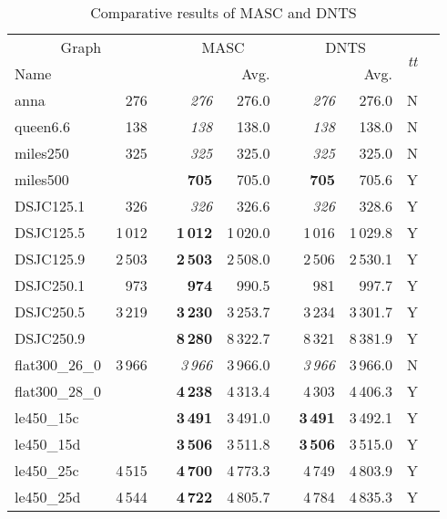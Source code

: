 \documentclass{elsart}
\begin{document}
\begin{table}\begin{scriptsize}
\caption{Comparative results of MASC and DNTS} \label{table_MASC_TS}
\begin{tabular}{lrcrrrrrcl}
\hline
\multicolumn{2}{c}{Graph} && \multicolumn{2}{c}{MASC} & &\multicolumn{2}{c}{DNTS} &\multirow{2}{*}{\emph{tt}}\\  
\cline{1-2}\cline{4-5} \cline{7-8} 
Name&&&  & Avg. & &  & Avg. \\
\hline
anna              & 276 && \emph{276} & 276.0 & &\emph{276}   & 276.0 & N\\
queen6.6          & 138 && \textit{138} & 138.0 && \emph{138}  & 138.0 &N\\
miles250          & 325    && \textit{325} & 325.0 & &\emph{325} & 325.0 &N \\
miles500          &    && \textbf{705} & 705.0 & & \textbf{705} & 705.6 &Y\\
DSJC125.1         & 326  && \textit{326}  & 326.6 & & \emph{326}  & 328.6 &Y\\
DSJC125.5         & 1\,012   && \textbf{1\,012}  & 1\,020.0  & & 1\,016  & 1\,029.8  &Y\\
DSJC125.9         & 2\,503 && \textbf{2\,503}  & 2\,508.0   & & 2\,506  & 2\,530.1  &Y \\
DSJC250.1         & 973  && \textbf{974}  & 990.5    &  & 981  & 997.7   &Y \\
DSJC250.5          &3\,219  &&\textbf{3\,230}  & 3\,253.7  & &3\,234  & 3\,301.7  &Y\\
DSJC250.9         &   && \textbf{8\,280}  & 8\,322.7   && 8\,321  & 8\,381.9   &Y\\
flat300\_26\_0    & 3\,966 && \textit{3\,966} & 3\,966.0  & & \emph{3\,966} & 3\,966.0  &N\\
flat300\_28\_0    &   &&  \textbf{4\,238} & 4\,313.4 & &  4\,303 & 4\,406.3 &Y\\
le450\_15c        &   && \textbf{3\,491} & 3\,491.0   & & \textbf{3\,491} & 3\,492.1  &Y \\
le450\_15d        &   &&  \textbf{3\,506} & 3\,511.8  &  &  \textbf{3\,506} & 3\,515.0 &Y \\
le450\_25c       & 4\,515  && \textbf{4\,700} & 4\,773.3  & & 4\,749 & 4\,803.9  &Y\\
le450\_25d        & 4\,544 && \textbf{4\,722} & 4\,805.7 & & 4\,784 & 4\,835.3 &Y\\
\hline
\end{tabular}
\end{scriptsize}
\end{table}
\end{document}

